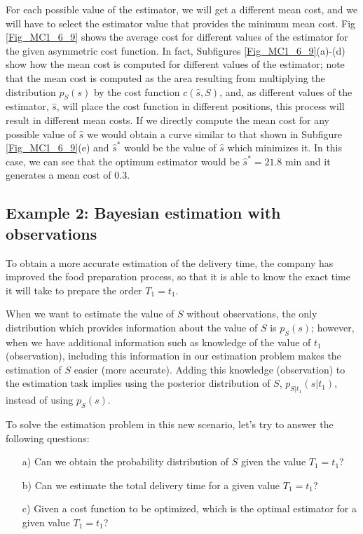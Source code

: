 \begin{solution}
\begin{itemize}
For each possible value of the estimator, we will get a different mean cost, and we will have to select the estimator value that provides the minimum mean cost. Fig \ref{Fig_MC1_6_9} shows the average cost for different values of the estimator for the given asymmetric cost function. In fact, Subfigures \ref{Fig_MC1_6_9}(a)-(d) show how the mean cost is computed for different values of the estimator; note that the mean cost is computed as the area resulting from multiplying the distribution $p_S(s)$ by the cost function $c(\hat{s},S)$, and, as different values of the estimator, $\hat{s}$,  will place the cost function in different positions, this process will result in different mean costs. If we directly compute the mean cost for any possible value of $\hat{s}$ we would obtain a curve similar to that shown in Subfigure \ref{Fig_MC1_6_9}(e) and $\hat{s}^{*}$ would be the value of $\hat{s}$ which minimizes it. In this case, we can see that the optimum  estimator would be $\hat{s}^{*} = 21.8$ min and it generates a mean cost of $0.3$.


\end{itemize}
\end{solution}

\subsection{Example 2: Bayesian estimation with observations}
\label{subsec:example2}

\begin{problem}
To obtain a more accurate estimation of the delivery time, the company has improved the food preparation process, so that it is able to know the exact time it will take to prepare the order $T_1=t_1$. 

When we want to estimate the value of $S$ without observations, the only distribution which provides information about the value of $S$ is $p_S(s)$; however, when we have additional information such as knowledge of the value of $t_1$ (observation), including this information in our estimation problem makes the estimation of $S$ easier (more accurate). Adding this knowledge (observation) to the estimation task implies using the posterior distribution of $S$, $p_{S|t_1}(s|t_1)$, instead of using $p_S(s)$.

To solve the estimation problem in this new scenario, let's try to answer the following questions:
 \begin{itemize}
\item[a)] Can we obtain the probability distribution of $S$ given the value $T_1=t_1$?
\item[b)] Can we estimate the total delivery time for a given value $T_1=t_1$? 
\item[c)] Given a cost function to be optimized, which is the optimal estimator for a given value $T_1=t_1$? 
    \end{itemize}
\end{problem}

